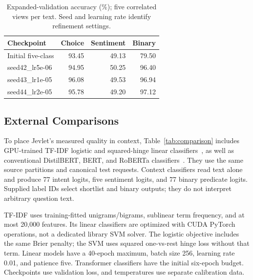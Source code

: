 \documentclass[conference]{IEEEtran}
\begin{document}
\begin{table}[t]
\caption{Expanded-validation accuracy (\%); five correlated views per text. Seed and learning rate identify refinement settings.}
\label{tab:validation}\centering\footnotesize\setlength{\tabcolsep}{3pt}
\begin{tabular}{lrrr}\toprule
Checkpoint & Choice & Sentiment & Binary\\\midrule
Initial five-class & 93.45 & 49.13 & 79.50 \\
seed42\_lr5e-06 & 94.95 & 50.25 & 96.40 \\
seed43\_lr1e-05 & 96.08 & 49.53 & 96.94 \\
seed44\_lr2e-05 & 95.78 & 49.20 & 97.12 \\
\bottomrule\end{tabular}\end{table}

\subsection{External Comparisons}
To place Jevlet's measured quality in context, Table~\ref{tab:comparison} includes GPU-trained TF-IDF logistic and squared-hinge linear classifiers~\cite{svm}, as well as conventional DistilBERT, BERT, and RoBERTa classifiers~\cite{roberta}. They use the same source partitions and canonical test requests. Context classifiers read text alone and produce 77 intent logits, five sentiment logits, and 77 binary predicate logits. Supplied label IDs select shortlist and binary outputs; they do not interpret arbitrary question text.

TF-IDF uses training-fitted unigrams/bigrams, sublinear term frequency, and at most 20,000 features. Its linear classifiers are optimized with CUDA PyTorch operations, not a dedicated library SVM solver. The logistic objective includes the same Brier penalty; the SVM uses squared one-vs-rest hinge loss without that term. Linear models have a 40-epoch maximum, batch size 256, learning rate 0.01, and patience five. Transformer classifiers have the initial six-epoch budget. Checkpoints use validation loss, and temperatures use separate calibration data.
\end{document}
